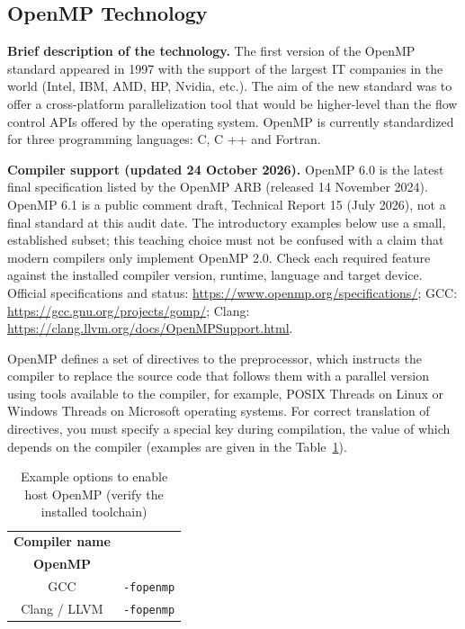 { %
	\subsection{OpenMP Technology}
	\label{OpenMP:section}
	\par\textbf{Brief description of the technology.} The first version of the OpenMP standard appeared in 1997 with the support of the largest IT companies in the world (Intel, IBM, AMD, HP, Nvidia, etc.). The aim of the new standard was to offer a cross-platform parallelization tool that would be higher-level than the flow control APIs offered by the operating system. OpenMP is currently standardized for three programming languages: C, C ++ and Fortran.
	\par\textbf{Compiler support (updated 24 October 2026).} OpenMP 6.0 is the latest final specification listed by the OpenMP ARB (released 14 November 2024). OpenMP 6.1 is a public comment draft, Technical Report 15 (July 2026), not a final standard at this audit date. The introductory examples below use a small, established subset; this teaching choice must not be confused with a claim that modern compilers only implement OpenMP 2.0. Check each required feature against the installed compiler version, runtime, language and target device. Official specifications and status: \url{https://www.openmp.org/specifications/}; GCC: \url{https://gcc.gnu.org/projects/gomp/}; Clang: \url{https://clang.llvm.org/docs/OpenMPSupport.html}.
	\par OpenMP defines a set of directives to the preprocessor, which instructs the compiler to replace the source code that follows them with a parallel version using tools available to the compiler, for example, POSIX Threads on Linux or Windows Threads on Microsoft operating systems. For correct translation of directives, you must specify a special key during compilation, the value of which depends on the compiler (examples are given in the Table~\ref{compilerOpenMP:table}).
	\begin{table}[H]
		\caption{Example options to enable host OpenMP (verify the installed toolchain)}
		\label{compilerOpenMP:table}
		\begin{center}
			\begin{tabular}{|c|c|}
				\hline
				\textbf{Compiler name} & \specialcell{\textbf{Compiler Key} \\  \textbf{OpenMP}} \\
				\hline
				GCC & \texttt{-fopenmp} \\
				\hline
				Clang / LLVM & \texttt{-fopenmp} \\

\end{tabular}
\end{center}
\end{table}}
